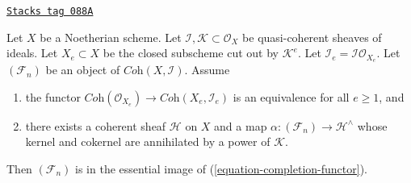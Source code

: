 \begin{lemma}
\label{coherent-lemma-existence-tricky}
\href{https://stacks.math.columbia.edu/tag/088A}{\texttt{Stacks tag 088A}}

Let $X$ be a Noetherian scheme. Let
$\mathcal{I}, \mathcal{K} \subset \mathcal{O}_X$
be quasi-coherent sheaves of ideals.
Let $X_e \subset X$ be the closed subscheme cut out by $\mathcal{K}^e$.
Let $\mathcal{I}_e = \mathcal{I}\mathcal{O}_{X_e}$.
Let $(\mathcal{F}_n)$ be an object of $\textit{Coh}(X, \mathcal{I})$.
Assume
\begin{enumerate}
\item the functor
$\textit{Coh}(\mathcal{O}_{X_e}) \to \textit{Coh}(X_e, \mathcal{I}_e)$
is an equivalence for all $e \geq 1$, and
\item there exists a coherent sheaf $\mathcal{H}$ on $X$ and a map
$\alpha : (\mathcal{F}_n) \to \mathcal{H}^\wedge$ whose
kernel and cokernel are annihilated by a power of $\mathcal{K}$.
\end{enumerate}
Then $(\mathcal{F}_n)$ is in the essential image of
(\ref{equation-completion-functor}).
\end{lemma}

